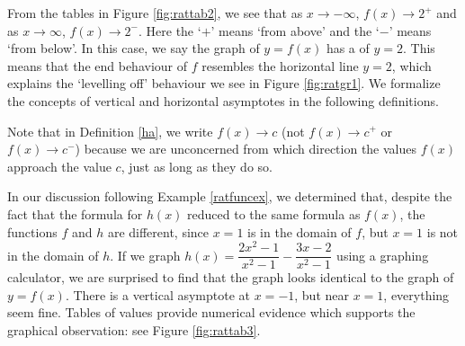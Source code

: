 From the tables in Figure \ref{fig:rattab2}, we see that as $x \rightarrow -\infty$, $f(x) \rightarrow 2^{+}$ and as $x \rightarrow \infty$, $f(x) \rightarrow 2^{-}$.  Here the `$+$' means `from above' and the `$-$' means `from below'.  In this case, we say the graph of $y=f(x)$ has a  of $y=2$.  This means that the end behaviour of $f$ resembles the horizontal line $y=2$, which explains the `levelling off' behaviour we see in Figure \ref{fig:ratgr1}.  We formalize the concepts of vertical and horizontal asymptotes in the following definitions.

\smallskip


\smallskip



\smallskip

Note that in Definition \ref{ha}, we write $f(x) \rightarrow c$ (not $f(x) \rightarrow c^{+}$ or $f(x) \rightarrow c^{-}$) because we are unconcerned from which direction the values $f(x)$ approach the value $c$, just as long as they do so.

In our discussion following Example \ref{ratfuncex}, we determined that, despite the fact that the formula for $h(x)$ reduced to the same formula as $f(x)$, the functions $f$ and $h$ are different, since $x=1$ is in the domain of $f$, but $x=1$ is not in the domain of $h$.  If we graph $h(x)=\dfrac{2x^2-1}{x^2-1} - \dfrac{3x-2}{x^2-1}$ using a graphing calculator, we are surprised to find that the graph looks identical to the graph of $y=f(x)$.   There is a vertical asymptote at $x=-1$, but near $x=1$, everything seem fine.  Tables of values provide numerical evidence which supports the graphical observation: see Figure \ref{fig:rattab3}.

